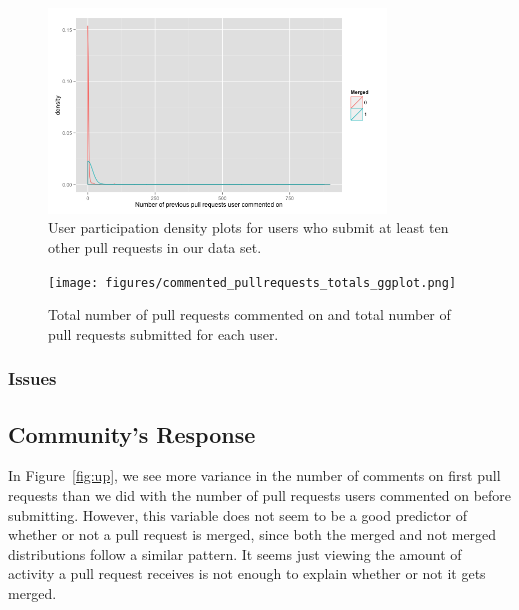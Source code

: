\documentclass{sigchi}
\begin{document}
\begin{figure}[p] \centering
\includegraphics[width=0.8\textwidth]{figures/number_comments_density_repeaters_10_ggplot.png}
\caption{User participation density plots for users who submit at least ten
other pull requests in our data set.} \label{fig:repeaters_10} \end{figure}

\begin{figure}[htbp] \centering
\texttt{[image: figures/commented\_pullrequests\_totals\_ggplot.png]}
\caption{Total number of pull requests commented on and total number of pull
requests submitted for each user.} \label{fig:commented_pullrequests_totals}
\end{figure}

\subsubsection{Issues}


\subsection{Community's Response} In Figure~\ref{fig:up}, we see more variance
in the number of comments on first pull requests than we did with the number of
pull requests users commented on before submitting. However, this variable does
not seem to be a good predictor of whether or not a pull request is merged,
since both the merged and not merged distributions follow a similar pattern. It
seems just viewing the amount of activity a pull request receives is not enough
to explain whether or not it gets merged.
\end{document}
